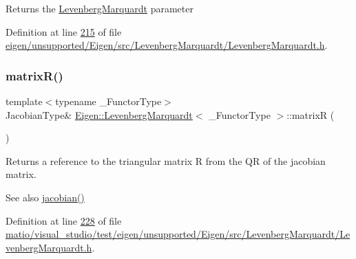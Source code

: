 \begin{DoxyReturn}{Returns}
the \hyperlink{class_eigen_1_1_levenberg_marquardt}{Levenberg\+Marquardt} parameter 
\end{DoxyReturn}


Definition at line \hyperlink{eigen_2unsupported_2_eigen_2src_2_levenberg_marquardt_2_levenberg_marquardt_8h_source_l00215}{215} of file \hyperlink{eigen_2unsupported_2_eigen_2src_2_levenberg_marquardt_2_levenberg_marquardt_8h_source}{eigen/unsupported/\+Eigen/src/\+Levenberg\+Marquardt/\+Levenberg\+Marquardt.\+h}.

\mbox{\label{class_eigen_1_1_levenberg_marquardt_afd6cd64fdd7ca32cc71a83d91432ea69}} 
\subsubsection{\texorpdfstring{matrix\+R()}{matrixR()}\hspace{0.1cm}{\footnotesize\ttfamily [1/2]}}
{\footnotesize\ttfamily template$<$typename \+\_\+\+Functor\+Type$>$ \\
Jacobian\+Type\& \hyperlink{class_eigen_1_1_levenberg_marquardt}{Eigen\+::\+Levenberg\+Marquardt}$<$ \+\_\+\+Functor\+Type $>$\+::matrixR (\begin{DoxyParamCaption}{ }\end{DoxyParamCaption})\hspace{0.3cm}{\ttfamily [inline]}}

\begin{DoxyReturn}{Returns}
a reference to the triangular matrix R from the QR of the jacobian matrix. 
\end{DoxyReturn}
\begin{DoxySeeAlso}{See also}
\hyperlink{class_eigen_1_1_levenberg_marquardt_aaf2179310fdf873483f5d8b46f15da8c}{jacobian()} 
\end{DoxySeeAlso}


Definition at line \hyperlink{matio_2visual__studio_2test_2eigen_2unsupported_2_eigen_2src_2_levenberg_marquardt_2_levenberg_marquardt_8h_source_l00228}{228} of file \hyperlink{matio_2visual__studio_2test_2eigen_2unsupported_2_eigen_2src_2_levenberg_marquardt_2_levenberg_marquardt_8h_source}{matio/visual\+\_\+studio/test/eigen/unsupported/\+Eigen/src/\+Levenberg\+Marquardt/\+Levenberg\+Marquardt.\+h}.

